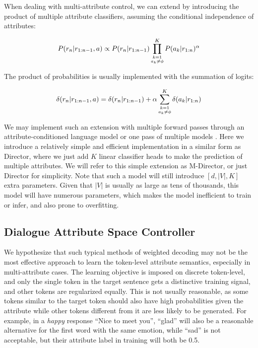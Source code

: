 When dealing with multi-attribute control, we can extend  by introducing the product of multiple attribute classifiers, assuming the conditional independence of attributes:

\begin{equation}
    \small
    P(r_n|r_{1:n-1}, a) \propto P(r_n|r_{1:n-1}) \prod_{\substack{k=1\\a_k\ne \phi}}^{K} P(a_k|r_{1:n})^{\alpha}
    \label{eqn:multi_wd}
\end{equation}

The product of probabilities is usually implemented with the summation of logits: 

\begin{equation}
    \small
    \delta(r_n|r_{1:n-1}, a) = \delta(r_n|r_{1:n-1}) + \alpha \sum_{\substack{k=1\\a_k\ne \phi}}^{K} \delta(a_k|r_{1:n})
    \label{eqn:multi_wd_logits}
\end{equation}

We may implement such an extension with multiple forward passes through an attribute-conditioned language model \citep{lin2021plug} or one pass of multiple models \citep{liu2021dexperts}. Here we introduce a relatively simple and efficient implementation in a similar form as Director, where we just add $K$ linear classifier heads to make the prediction of multiple attributes. We will refer to this simple extension as M-Director, or just Director for simplicity. Note that such a model will still introduce $[d, |V|, K]$ extra parameters. Given that $|V|$ is usually as large as tens of thousands, this model will have numerous parameters, which makes the model inefficient to train or infer, and also prone to overfitting.

\subsection{Dialogue Attribute Space Controller}
\label{sec:dasc_method}
We hypothesize that such typical methods of weighted decoding may not be the most effective approach to learn the token-level attribute semantics, especially in multi-attribute cases. The learning objective is imposed on discrete token-level, and only the single token in the target sentence gets a distinctive training signal, and other tokens are regularized equally. This is not usually reasonable, as some tokens similar to the target token should also have high probabilities given the attribute while other tokens different from it are less likely to be generated. For example, in a \textit{happy} response ``Nice to meet you'', ``glad'' will also be a reasonable alternative for the first word with the same emotion, while ``sad'' is not acceptable, but their attribute label in training will both be 0.5.

